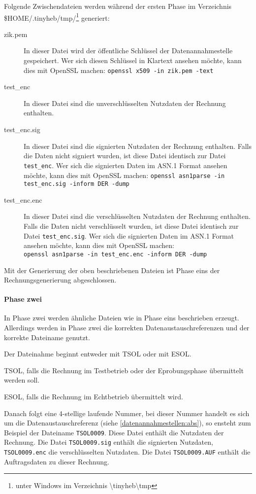 Folgende Zwischendateien werden während der ersten Phase im Verzeichnis
\$HOME/.tinyheb/tmp/\footnote{unter Windows im Verzeichnis \textbackslash tinyheb\textbackslash tmp}
generiert:
\begin{description}
\item[zik.pem]
In dieser Datei wird der öffentliche Schlüssel der Datenannahmestelle
gespeichert. Wer sich diesen Schlüssel in Klartext ansehen möchte, kann
dies mit OpenSSL machen:
\verb|openssl x509 -in zik.pem -text|
\item[test\_enc]
In dieser Datei sind die unverschlüsselten Nutzdaten der Rechnung enthalten.
\item[test\_enc.sig]
In dieser Datei sind die signierten Nutzdaten der Rechnung enthalten. Falls
die Daten nicht signiert wurden, ist diese Datei identisch zur Datei
\verb|test_enc|. Wer sich die signierten Daten im ASN.1 Format ansehen
möchte, kann dies mit OpenSSL machen: 
\verb|openssl asn1parse -in test_enc.sig -inform DER -dump|
\item[test\_enc.enc]
In dieser Datei sind die verschlüsselten Nutzdaten der Rechnung enthalten.
Falls die Daten nicht verschlüsselt wurden, ist diese Datei identisch zur
Datei \verb|test_enc.sig|. Wer sich die signierten Daten im ASN.1 Format
ansehen möchte, kann dies mit OpenSSL machen:\\
\verb|openssl asn1parse -in test_enc.enc -inform DER -dump|
\end{description}

Mit der Generierung der oben beschriebenen Dateien ist Phase eins der
Rechnungsgenerierung abgeschlossen.


\paragraph{Phase zwei}
In Phase zwei werden ähnliche Dateien wie in Phase eins beschrieben erzeugt.
Allerdings werden in Phase zwei die korrekten Datenaustauschreferenzen und
der korrekte Dateiname genutzt.

Der Dateinahme beginnt entweder mit TSOL oder mit ESOL. 

TSOL, falls die Rechnung im Testbetrieb oder der Eprobungsphase 
übermittelt werden soll.

ESOL, falls die Rechnung im Echtbetrieb übermittelt wird.

Danach folgt eine 4-stellige laufende Nummer, bei dieser Nummer handelt es
sich um die Datenaustauschreferenz (siehe \vref{datenannahmestellen:abs}),
so ensteht zum Beispiel der Dateiname \verb|TSOL0009|. Diese Datei enthält die
Nutzdaten der Rechnung. Die Datei \verb|TSOL0009.sig| enthält die signierten
Nutzdaten, \verb|TSOL0009.enc| die verschlüsselten Nutzdaten. Die Datei 
\verb|TSOL0009.AUF| enthält die Auftragsdaten zu dieser Rechnung.

